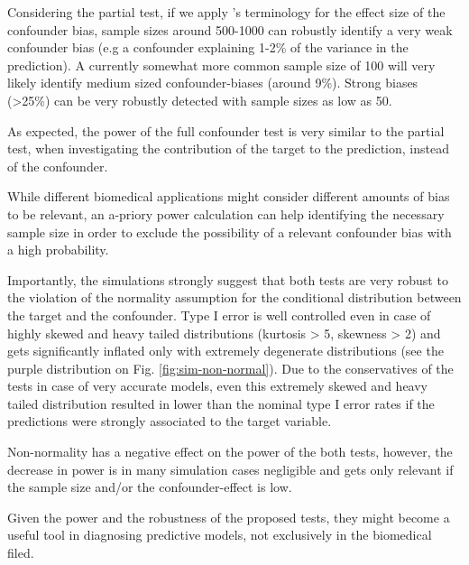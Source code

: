 \documentclass{article}
\begin{document}
Considering the partial test, if we apply \citeauthor{cohen2013statistical}'s terminology for the effect size of the confounder bias, sample sizes around 500-1000 can robustly identify a very weak confounder bias (e.g a confounder explaining 1-2\% of the variance in the prediction). A currently somewhat more common sample size of 100 will very likely identify medium sized confounder-biases (around 9\%). Strong biases  (>25\%) can be very robustly detected with sample sizes as low as 50. 

As expected, the power of the full confounder test is very similar to the partial test, when investigating the contribution of the target to the prediction, instead of the confounder.

While different biomedical applications might consider different amounts of bias to be relevant, an a-priory power calculation can help identifying the necessary sample size in order to exclude the possibility of a relevant confounder bias with a high probability.

Importantly, the simulations strongly suggest that both tests are very robust to the violation of the normality assumption for the conditional distribution between the target and the confounder. Type I error is well controlled even in case of highly skewed and heavy tailed distributions (kurtosis > 5, skewness > 2) and gets significantly inflated only with extremely degenerate distributions (see the purple distribution on Fig. \ref{fig:sim-non-normal}). Due to the conservatives of the tests in case of very accurate models, even this extremely skewed and heavy tailed distribution resulted in lower than the nominal type I error rates if the predictions were strongly associated to the target variable.

Non-normality has a negative effect on the power of the both tests, however, the decrease in power is in many simulation cases negligible and gets only relevant if the sample size and/or the confounder-effect is low.

Given the power and the robustness of the proposed tests, they might become a useful tool in diagnosing predictive models, not exclusively in the biomedical filed. 
\end{document}
